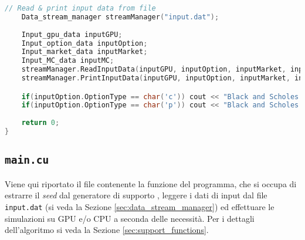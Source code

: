 \begin{lstlisting}[language=C++, caption={\texttt{libraries/CoreLibraries/Path/BlackScholesUnitTest.cu}}]
	// Read & print input data from file
	Data_stream_manager streamManager("input.dat");
	
	Input_gpu_data inputGPU;
	Input_option_data inputOption;
	Input_market_data inputMarket;
	Input_MC_data inputMC;
	streamManager.ReadInputData(inputGPU, inputOption, inputMarket, inputMC);
	streamManager.PrintInputData(inputGPU, inputOption, inputMarket, inputMC);

	if(inputOption.OptionType == char('c')) cout << "Black and Scholes Call price: " << setprecision(20) << GetBlackAndScholesCallPrice(inputMarket, inputOption) << endl << endl;
	if(inputOption.OptionType == char('p')) cout << "Black and Scholes Put price: " << setprecision(20) << GetBlackAndScholesPutPrice(inputMarket, inputOption) << endl << endl;
	
    return 0;
}
\end{lstlisting}

\subsection{\texttt{main.cu}}
Viene qui riportato il file contenente la funzione  del programma, che si occupa di estrarre il \textit{seed} dal generatore di supporto , leggere i dati di input dal file \verb|input.dat| (si veda la Sezione \ref{sec:data_stream_manager}) ed effettuare le simulazioni su GPU e/o CPU a seconda delle necessità. Per i dettagli dell'algoritmo si veda la Sezione \ref{sec:support_functions}.

